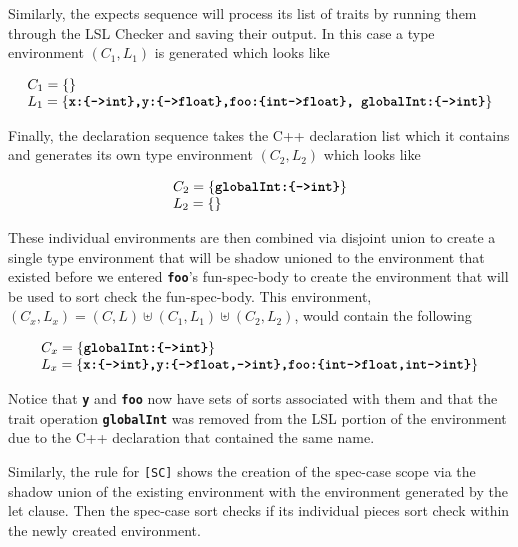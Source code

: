 \documentclass[12pt]{article} %
\newcommand{\reserved}[1]{\textbf{\texttt{#1}}} %
\newcommand{\RULELAB}[1]{\texttt{#1}}
\begin{document}
Similarly, the expects
sequence will process its list of traits by running them through the
LSL Checker and saving their output. In this case a type environment
$(C_1,L_1)$ is generated which looks like

\begin{displaymath}
\begin{array}{l}
C_1 = \{\}
\\
L_1 =\{\mbox{\reserved{x:\{->int\},y:\{->float\},foo:\{int->float\}, globalInt:\{->int\}}}\}
\end{array}
\end{displaymath}

Finally, the declaration sequence takes the C++ declaration
list which it contains and generates its own type environment
$(C_2,L_2)$ which looks like

\begin{displaymath}
\begin{array}{l}
C_2 = \{\mbox{\reserved{globalInt:\{->int\}}}\}
\\
L_2 =\{\}
\end{array}
\end{displaymath}

These individual environments are then combined via disjoint union to
create a single type environment that will be shadow unioned to the
environment that existed before we entered \reserved{foo}'s
fun-spec-body to create the environment that will be used to sort
check the fun-spec-body. This environment, $(C_x,L_x) = (C,L) \uplus (C_1,L_1)
\uplus (C_2,L_2)$, would contain the following

\begin{displaymath}
\begin{array}{l}
C_x = \{\mbox{\reserved{globalInt:\{->int\}}}\}
\\
L_x =\{\mbox{\reserved{x:\{->int\},y:\{->float,->int\},foo:\{int->float,int->int\}}}\}
\end{array}
\end{displaymath}

\noindent Notice that \reserved{y} and \reserved{foo} now have sets of 
sorts associated with them and that the trait operation
\reserved{globalInt} was removed from the LSL portion of the
environment due to the C++ declaration that contained the same name.

Similarly, the rule for \RULELAB{[SC]} shows the creation of the
spec-case scope via the shadow union of the existing environment with
the environment generated by the let clause. Then the spec-case sort
checks if its individual pieces sort check within the newly created
environment.
\end{document}
